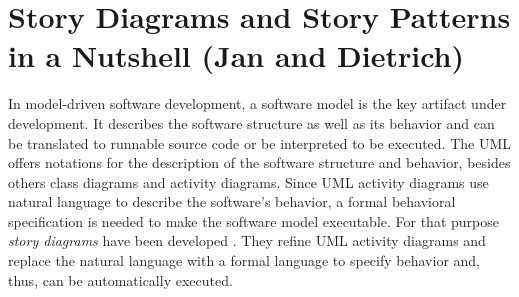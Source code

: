 \section{Story Diagrams and Story Patterns in a Nutshell (Jan and Dietrich)} \label{sec:Overview}



In model-driven software development, a software model is the key artifact under development.
It describes the software structure as well as its behavior and 
can be translated to runnable source code or be interpreted to be executed.
The UML offers notations for the description of the software structure and behavior,
besides others class diagrams and activity diagrams.
Since UML activity diagrams use natural language to describe the software's behavior,
a formal behavioral specification is needed to make the software model executable.
For that purpose \emph{story diagrams} have been developed \cite{FNTZ00}.
They refine UML activity diagrams and replace the natural language with a formal language to specify behavior
and, thus, can be automatically executed.


